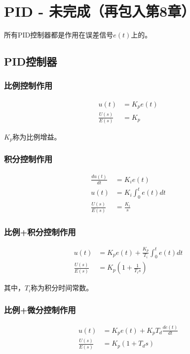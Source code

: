 \section{PID - 未完成（再包入第8章）}

所有PID控制器都是作用在误差信号$e(t)$上的。

\subsection{PID控制器}

\subsubsection{比例控制作用}

\begin{align*}
u(t)&=K_pe(t)\\
\frac{U(s)}{E(s)}&=K_p
\end{align*}

$K_p$称为比例增益。

\subsubsection{积分控制作用}

\begin{align*}
\frac{du(t)}{dt}&=K_ie(t)\\
u(t)&=K_i\int_0^te(t)dt\\
\frac{U(s)}{E(s)}&=\frac{K_i}{s}
\end{align*}

\subsubsection{比例+积分控制作用}

\begin{align*}
u(t)&=K_pe(t)+\frac{K_p}{T_i}\int_0^te(t)dt\\
\frac{U(s)}{E(s)}&=K_p\left(1+\frac{1}{T_is}\right)
\end{align*}

其中，$T_i$称为积分时间常数。

\subsubsection{比例+微分控制作用}

\begin{align*}
u(t)&=K_pe(t)+K_pT_d\frac{de(t)}{dt}\\
\frac{U(s)}{E(s)}&=K_p(1+T_ds)
\end{align*}

